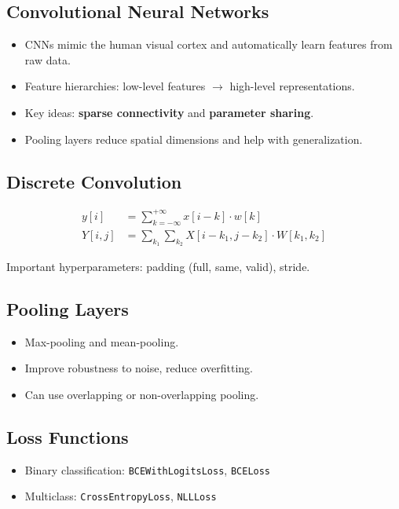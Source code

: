 \subsection{Convolutional Neural Networks}
\begin{itemize}[topsep=0pt]
    \item CNNs mimic the human visual cortex and automatically learn features from raw data.
    \item Feature hierarchies: low-level features $\rightarrow$ high-level representations.
    \item Key ideas: \textbf{sparse connectivity} and \textbf{parameter sharing}.
    \item Pooling layers reduce spatial dimensions and help with generalization.
\end{itemize}

\subsection{Discrete Convolution}
\begin{align*}
y[i] &= \sum_{k=-\infty}^{+\infty} x[i-k] \cdot w[k] \\
Y[i,j] &= \sum_{k_1} \sum_{k_2} X[i-k_1, j-k_2] \cdot W[k_1, k_2]
\end{align*}

\noindent
Important hyperparameters: padding (full, same, valid), stride.

\subsection{Pooling Layers}
\begin{itemize}
    \item Max-pooling and mean-pooling.
    \item Improve robustness to noise, reduce overfitting.
    \item Can use overlapping or non-overlapping pooling.
\end{itemize}

\subsection{Loss Functions}
\begin{itemize}
    \item Binary classification: \texttt{BCEWithLogitsLoss}, \texttt{BCELoss}
    \item Multiclass: \texttt{CrossEntropyLoss}, \texttt{NLLLoss}
\end{itemize}